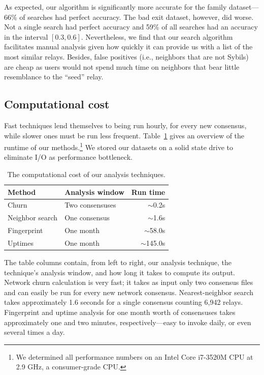As expected, our algorithm is significantly more accurate for the family
dataset---66\% of searches had perfect accuracy.  The bad exit dataset, however,
did worse.  Not a single search had perfect accuracy and 59\% of all searches
had an accuracy in the interval $[0.3,0.6]$.  Nevertheless, we find that our
search algorithm facilitates manual analysis given how quickly it can provide us
with a list of the most similar relays.  Besides, false positives (i.e.,
neighbors that are not Sybils) are cheap as \sys users would not spend much time
on neighbors that bear little resemblance to the ``seed'' relay.

\subsection{Computational cost}
\label{sec:performance}
Fast techniques lend themselves to being run hourly, for every new consensus,
while slower ones must be run less frequent.  Table~\ref{tab:exp-deployment}
gives an overview of the runtime of our methods.\footnote{We determined all
performance numbers on an Intel Core i7-3520M CPU at 2.9 GHz, a consumer-grade
CPU.}  We stored our datasets on a solid state drive to eliminate I/O as
performance bottleneck.

\begin{table}[t]
	\centering
	\begin{tabular}{l l r}
	\toprule
	\textbf{Method} & \textbf{Analysis window} & \textbf{Run time} \\
	\midrule
	Churn & Two consensuses & $\sim$0.2s \\
	Neighbor search & One consensus & $\sim$1.6s \\
	Fingerprint & One month & $\sim$58.0s \\
	Uptimes & One month & $\sim$145.0s \\
	\bottomrule
	\end{tabular}
	\caption{The computational cost of our analysis techniques.}
	\label{tab:exp-deployment}
\end{table}

The table columns contain, from left to right, our analysis technique, the
technique's analysis window, and how long it takes to compute its output.
Network churn calculation is very fast; it takes as input only two consensus
files and can easily be run for every new network consensus.  Nearest-neighbor
search takes approximately 1.6 seconds for a single consensus counting 6,942
relays.  Fingerprint and uptime analysis for one month worth of consensuses
takes approximately one and two minutes, respectively---easy to invoke daily, or
even several times a day.

